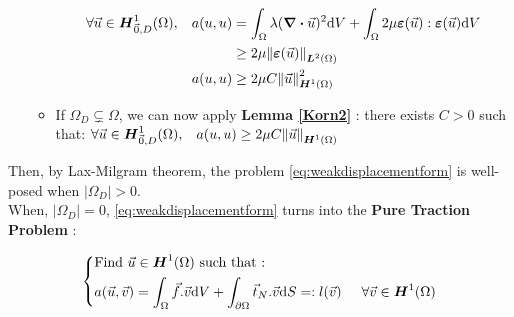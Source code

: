 \documentclass[a4paper,12pt,twoside]{report}
\newcommand{\dif}{\mathrm{d}}
\begin{document}
\begin{itemize}
\begin{itemize}
            \begin{equation*}
                \begin{aligned}
                    \forall \vec u \in \boldsymbol H^1_{\vec 0,D}(\Omega), \hspace{0.3cm} a(u,u) 
                    &= \int_\Omega \lambda (\div \vec u)^2 \dif V + \int_\Omega 2\mu \boldsymbol \varepsilon(\vec u): \boldsymbol \varepsilon (\vec u)\dif V \\
                    & \geq 2\mu \norm{\boldsymbol \varepsilon(\vec u)}_{\boldsymbol{L}^2(\Omega)} \\
                    a(u,u) & \geq 2\mu C \norm{\vec u}_{\boldsymbol{H}^1(\Omega)}^2
                \end{aligned}
            \end{equation*}
            \item If $\Omega_D \subsetneq \Omega$, we can now apply \textbf{Lemma \ref{Korn2}} : there exists $C >0$ such that:
            $\forall \vec u \in \boldsymbol H^1_{\vec 0,D}(\Omega), \hspace{0.3cm}a(u,u) \geq 2\mu C \norm{\vec u}_{\boldsymbol{H}^1(\Omega)}$
        \end{itemize}
\end{itemize}

Then, by Lax-Milgram theorem, the problem \eqref{eq:weakdisplacementform} is well-posed when $\left| \Omega_D \right| > 0$. \\
When, $\left| \Omega_D \right| = 0$, \eqref{eq:weakdisplacementform} turns into the\textbf{ Pure Traction Problem} : 
\begin{tcolorbox}
\begin{equation}
\label{eq:puretractionproblem}
\left\{
    \begin{aligned}
    &\text{Find } \vec u \in \boldsymbol H^1(\Omega) \text{ such that :}\\
    & a(\vec u,\vec v) = \int_\Omega \vec f . \vec v \dif V + \int_{\partial\Omega} \vec t_N.\vec v \dif S =:l(\vec v) \hspace{0.5cm} \forall \vec v \in \boldsymbol H^1(\Omega)
    \end{aligned}
\right.
\end{equation}
\end{tcolorbox}
\end{document}
